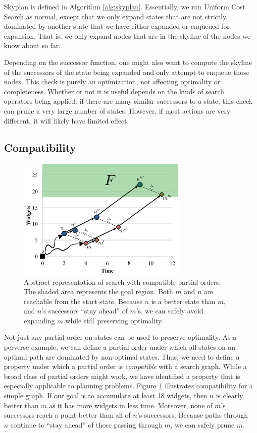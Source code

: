 \documentclass[letterpaper]{article}
\theoremstyle{plain} \newtheorem{theorem}{Theorem} \newtheorem{proposition}{Proposition} \newtheorem{lemma}{Lemma}
\theoremstyle{definition} \newtheorem{definition}{Definition} \newtheorem{conjecture}{Conjecture} \newtheorem*{example}{Example}
\theoremstyle{remark} \newtheorem*{remark}{Remark} \newtheorem*{note}{Note} \newtheorem{case}{Case}
\begin{document}
Skyplan is defined in Algorithm \ref{alg:skyplan}. Essentially, we
run Uniform Cost Search as normal, except that we only expand states
that are not strictly dominated by another state that we have either
expanded or enqueued for expansion. That is, we only expand nodes
that are in the skyline of the nodes we know about so far.

Depending on the successor function, one might also want to compute
the skyline of the successors of the state being expanded and only
attempt to enqueue those nodes.  This check is purely an optimization,
not affecting optimality or completeness. Whether or not it is
useful depends on the kinds of search operators being applied: if
there are many similar successors to a state, this check can prune a very large
number of states. However, if most actions are very different, it will
likely have limited effect.

\subsection{Compatibility}
\begin{figure}
	\begin{center}
	\includegraphics[width=3.3in]{compatibility-2.pdf}
\end{center}
  \caption{Abstract representation of search with compatible partial
  orders. The shaded area represents the goal region. Both $m$ and $n$ are reachable from the start state.
  Because $n$ is a better state than $m$, and $n$'s successors
  ``stay ahead'' of $m$'s, we can safely avoid expanding $m$ while
  still preserving optimality.}
  \label{fig:compatibility}
\end{figure}

Not just any partial order on states can be used to preserve optimality. As a perverse
example, we can define a partial order under which all states
on an optimal path
are dominated by non-optimal states. Thus, we need to define a property
under which a partial order is \textit{compatible} with a search graph. 
While a broad class of partial orders might work, we have identified
a property that is especially applicable to planning problems.
Figure \ref{fig:compatibility} illustrates 
compatibility for a simple graph. If our goal is to accumulate at
least 18 widgets, then $n$ is clearly better than $m$ as
it has more widgets in less time. Moreover, none
of $m$'s successors reach a point better than all of $n$'s 
successors. Because paths through $n$ continue to
``stay ahead'' of those passing through $m$, we
can safely prune $m$.
\end{document}
